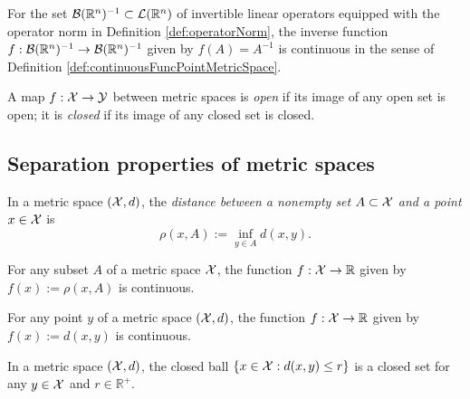 \begin{lem}
  \label{lem:funcInverseIsContinuous}
  For the set ${\cal B}(\mathbb{R}^n)^{-1}\subset
  {\cal L}(\mathbb{R}^n)$
  of invertible linear operators equipped
  with the operator norm in Definition \ref{def:operatorNorm},
  the inverse function 
  $f: {\cal B}(\mathbb{R}^n)^{-1}\rightarrow
  {\cal B}(\mathbb{R}^n)^{-1}$ 
  given by $f(A) = A^{-1}$ is continuous
  in the sense of Definition \ref{def:continuousFuncPointMetricSpace}.
\end{lem}

\begin{defn}
  \label{def:openMap}
  A map $f:{\cal X}\rightarrow {\cal Y}$ between metric spaces is \emph{open}
  if its image of any open set is open; 
  it is \emph{closed} if its image of any closed set is closed. 
\end{defn}

\subsection{Separation properties of metric spaces}
\label{sec:separ-prop}

\begin{defn}
  \label{def:distPointAndSet}
  In a metric space $({\cal X},d)$, 
  the \emph{distance between a nonempty set $A\subset {\cal X}$
    and a point $x\in {\cal X}$}
  is
  \begin{equation}
    \label{eq:distPointAndSet}
    \rho(x,A) := \inf_{y\in A} d(x,y).
  \end{equation}
\end{defn}

\begin{lem}
  \label{lem:distPointAndSetContinuous}
  For any subset $A$ of a metric space ${\cal X}$,
  the function $f: {\cal X}\rightarrow \mathbb{R}$
  given by $f(x):= \rho(x,A)$ is continuous.
\end{lem}

\begin{coro}
  \label{coro:metricContinuous}
  For any point $y$ of a metric space $({\cal X},d)$,
  the function $f: {\cal X}\rightarrow \mathbb{R}$
  given by $f(x):= d(x,y)$ is continuous.
\end{coro}

\begin{coro}
  \label{coro:closedBallIsClosed}
  In a metric space $({\cal X},d)$,
  the closed ball $\{x\in{\cal X}: d(x,y)\le r\}$
  is a closed set for any $y\in {\cal X}$ and $r\in\mathbb{R}^+$.
\end{coro}

